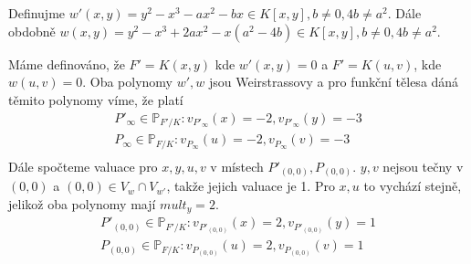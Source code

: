 \documentclass[12pt, a4paper]{article}
\begin{document}
\section{}
Definujme $w'(x,y)=y^2-x^3-ax^2-bx \in K[x,y], b \neq 0, 4b \neq a^2$. Dále obdobně $w(x,y) = y^2 - x^3 + 2ax^2 - x(a^2-4b) \in K[x,y], b \neq 0, 4b \neq a^2$. 

Máme definováno, že $F' = K(x,y)$ kde $w'(x,y)=0$ a $F' = K(u,v)$, kde $w(u,v)=0$. Oba polynomy $w',w$ jsou Weirstrassovy a pro funkční tělesa dáná těmito polynomy víme, že platí
\begin{gather*}
P'_\infty \in \mathbb{P}_{F'/K}: v_{P'_\infty}(x)=-2, v_{P'_\infty}(y) = -3\\
P_\infty \in \mathbb{P}_{F/K}: v_{P_\infty}(u)=-2, v_{P_\infty}(v) = -3\\
\end{gather*}
Dále spočteme valuace pro $x,y,u,v$ v místech $P'_{(0,0)}, P_{(0,0)}$. $y,v$ nejsou tečny v $(0,0)$ a $(0,0) \in V_w \cap V_{w'}$, takže jejich valuace je 1. Pro $x,u$ to vychází stejně, jelikož oba polynomy mají $mult_y=2$.
\begin{gather*}
P'_{(0,0)} \in \mathbb{P}_{F'/K}: v_{P'_{(0,0)}}(x)=2, v_{P'_{(0,0)}}(y) = 1\\
P_{(0,0)} \in \mathbb{P}_{F/K}: v_{P_{(0,0)}}(u)=2, v_{P_{(0,0)}}(v) = 1
\end{gather*}
\end{document}
